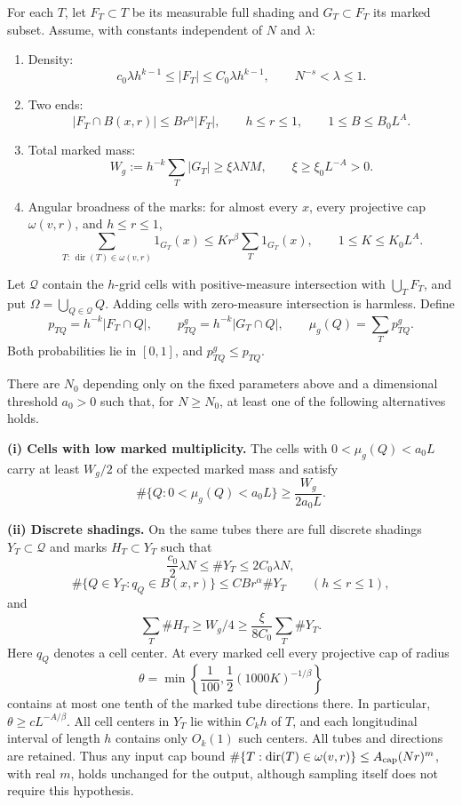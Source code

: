 \documentclass[
  11pt,
  a4paper,
]{article}
\begin{document}
For each \(T\), let \(F_T\subset T\) be its measurable full shading and
\(G_T\subset F_T\) its marked subset. Assume, with constants independent
of \(N\) and \(\lambda\):

\begin{enumerate}
\def\labelenumi{\arabic{enumi}.}
\item
  Density: \[c_0\lambda h^{k-1}\le |F_T|\le C_0\lambda h^{k-1},
    \qquad N^{-s}<\lambda\le1.
    \tag{6.1}\label{eq:6.1}\]
\item
  Two ends: \[|F_T\cap B(x,r)|\le B r^\alpha |F_T|,
    \qquad h\le r\le1,
    \qquad 1\le B\le B_0L^A.
    \tag{6.2}\label{eq:6.2}\]
\item
  Total marked mass: \[W_g:=h^{-k}\sum_T|G_T|\ge\xi\lambda NM,
    \qquad \xi\ge\xi_0L^{-A}>0.
    \tag{6.3}\label{eq:6.3}\]
\item
  Angular broadness of the marks: for almost every \(x\), every
  projective cap \(\omega(v,r)\), and \(h\le r\le1\),
  \[\sum_{T:\,\operatorname{dir}(T)\in\omega(v,r)}1_{G_T}(x)
    \le K r^\beta\sum_T1_{G_T}(x),
    \qquad 1\le K\le K_0L^A.
    \tag{6.4}\label{eq:6.4}\]
\end{enumerate}

Let \(\mathcal Q\) contain the \(h\)-grid cells with positive-measure
intersection with \(\bigcup_TF_T\), and put
\(\Omega=\bigcup_{Q\in\mathcal Q}Q\). Adding cells with zero-measure
intersection is harmless. Define \[p_{TQ}=h^{-k}|F_T\cap Q|,\qquad
 p^g_{TQ}=h^{-k}|G_T\cap Q|,\qquad
 \mu_g(Q)=\sum_Tp^g_{TQ}.
 \tag{6.5}\label{eq:6.5}\] Both probabilities lie in \([0,1]\), and
\(p^g_{TQ}\le p_{TQ}\).

There are \(N_0\) depending only on the fixed parameters above and a
dimensional threshold \(a_0>0\) such that, for \(N\ge N_0\), at least
one of the following alternatives holds.

\textbf{(i) Cells with low marked multiplicity.} The cells with
\(0<\mu_g(Q)<a_0L\) carry at least \(W_g/2\) of the expected marked mass
and satisfy \[\#\{Q:0<\mu_g(Q)<a_0L\}
 \ge\frac{W_g}{2a_0L}.
 \tag{6.6}\label{eq:6.6}\]

\textbf{(ii) Discrete shadings.} On the same tubes there are full
discrete shadings \(Y_T\subset\mathcal Q\) and marks \(H_T\subset Y_T\)
such that \[\frac{c_0}{2}\lambda N\le\#Y_T\le2C_0\lambda N,
 \tag{6.7}\label{eq:6.7}\] \[\#\{Q\in Y_T:q_Q\in B(x,r)\}
 \le C B r^\alpha\#Y_T
 \qquad(h\le r\le1),
 \tag{6.8}\label{eq:6.8}\] and \[\sum_T\#H_T\ge W_g/4
 \ge\frac{\xi}{8C_0}\sum_T\#Y_T.
 \tag{6.9}\label{eq:6.9}\] Here \(q_Q\) denotes a cell center. At every marked cell
every projective cap of radius
\[\theta=\min\left\{\frac1{100},\frac12(1000K)^{-1/\beta}\right\}
 \tag{6.10}\label{eq:6.10}\] contains at most one tenth of the marked tube directions
there. In particular, \(\theta\ge cL^{-A/\beta}\). All cell centers in
\(Y_T\) lie within \(C_kh\) of \(T\), and each longitudinal interval of
length \(h\) contains only \(O_k(1)\) such centers. All tubes and
directions are retained. Thus any input cap bound
\(\#\{T:\operatorname{dir}(T)\in\omega(v,r)\}\le A_{\rm cap}(Nr)^m\),
with real \(m\), holds unchanged for the output, although sampling
itself does not require this hypothesis.
\end{document}
